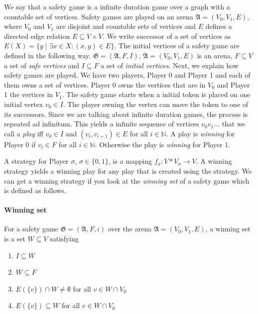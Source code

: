 \documentclass[10pt,a4paper]{article}
\theoremstyle{plain}
\theoremstyle{definition}
\begin{document}
We say that a safety game is a infinite duration game over a graph with a countable set of vertices. Safety games are played on an arena $\mathfrak{A} = (V_{0}, V_{1}, E)$, where $V_{0}$ and $V_{1}$ are disjoint and countable sets of vertices and $E$ defines a directed edge relation $E \subseteq V \times V$. We write successor of a set of vertices as $E(X) = \{y \;|\; \exists x \in X : (x,y) \in E\}$.
The initial vertices of a safety game are defined in the following way. $\mathfrak{G} = (\mathfrak{A}, F, I)$, $\mathfrak{A} = (V_{0}, V_{1}, E)$ is an arena, $F \subseteq V$ a set of \textit{safe vertices} and $I \subseteq F$ a set of \textit{initial vertices}. Next, we explain how safety games are played. We have two players, Player 0 and Player 1 and each of them owns a set of vertices. Player 0 owns the vertices that are in $V_{0}$ and Player 1 the vertices in $V_{1}$. The safety game starts when a initial token is placed on one initial vertex $v_{0} \in I$. The player owning the vertex can move the token to one of its successors. Since we are talking about infinite duration games, the process is repeated ad infinitum. This yields a infinite sequence of vertices $v_{0}v_{1}...$ that we call a \textit{play} iff $v_{0} \in I$ and $(v_{i}, v_{i+1}) \in E$ for all $i \in \mathbb{N}$. A play is \textit{winning} for Player 0 if $v_{i} \in F$ for all $i \in \mathbb{N}$. Otherwise the play is \textit{winning} for Player 1.

A strategy for Player $\sigma$, $\sigma \in \{0,1\}$, is a mapping $f_{\sigma} : V*V_{\sigma} \to V$. A winning strategy yields a winning play for any play that is created using the strategy. We can get a winning strategy if you look at the \textit{winning set} of a safety game which is defined as follows.
\paragraph*{Winning set} For a safety game $\mathfrak{G} = (\mathfrak{A}, F, i)$ over the arena $\mathfrak{A} = (V_{0}, V_{1}, E)$, a winning set is a set $W \subseteq V$ satisfying
\begin{enumerate}
\item $I \subseteq W$
\item $W \subseteq F$
\item $E(\{v\}) \cap W \neq \emptyset$ for all $v \in W \cap V_{0}$
\item $E(\{v\}) \subseteq W$ for all $v \in W \cap V_{0}$
\end{enumerate}
\end{document}
